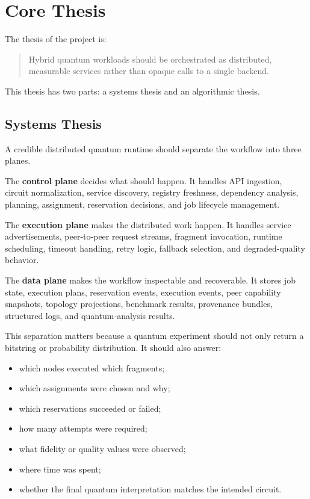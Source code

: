 \documentclass[11pt]{article}
\begin{document}
\section{Core Thesis}

The thesis of the project is:

\begin{quote}
Hybrid quantum workloads should be orchestrated as distributed, measurable services rather than opaque calls to a single backend.
\end{quote}

This thesis has two parts: a systems thesis and an algorithmic thesis.

\subsection{Systems Thesis}

A credible distributed quantum runtime should separate the workflow into three planes.

The \textbf{control plane} decides what should happen. It handles API ingestion, circuit normalization, service discovery, registry freshness, dependency analysis, planning, assignment, reservation decisions, and job lifecycle management.

The \textbf{execution plane} makes the distributed work happen. It handles service advertisements, peer-to-peer request streams, fragment invocation, runtime scheduling, timeout handling, retry logic, fallback selection, and degraded-quality behavior.

The \textbf{data plane} makes the workflow inspectable and recoverable. It stores job state, execution plans, reservation events, execution events, peer capability snapshots, topology projections, benchmark results, provenance bundles, structured logs, and quantum-analysis results.

This separation matters because a quantum experiment should not only return a bitstring or probability distribution. It should also answer:

\begin{itemize}
\item which nodes executed which fragments;
\item which assignments were chosen and why;
\item which reservations succeeded or failed;
\item how many attempts were required;
\item what fidelity or quality values were observed;
\item where time was spent;
\item whether the final quantum interpretation matches the intended circuit.
\end{itemize}
\end{document}
